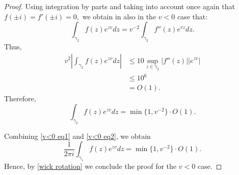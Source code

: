 \begin{proof}
        Using integration by parts and taking into account once again that $f(\pm i)=f'(\pm i)=0,$ we obtain in also in the $v < 0$ case that:
        $$\int_{\gamma_2}f(z)e^{zv}dz=v^{-2}\int_{\gamma_2}f''(z)e^{vz}dz.$$
        Thus,
        \begin{align*}
            v^2\left|\int_{\gamma_2}f(z)e^{zv}dz\right| &\leq 10\sup_{z\in\gamma_2}|f''(z)||e^{zv}|\\
                                                        &\leq 10^6\\
                                                        &= O(1).
        \end{align*}
        Therefore,
        \begin{equation}\label{v<0 eq2}
            \int_{\gamma_2}f(z)e^{zv}dz=\min\{1,v^{-2}\}\cdot O(1).
        \end{equation}

        Combining \eqref{v<0 eq1} and \eqref{v<0 eq2}, we obtain
        \begin{equation*}
            \frac1{2\pi i}\int_{\gamma_1}f(z)e^{zv}dz=\min\{1,v^{-2}\}\cdot O(1).
        \end{equation*}
        Hence, by \eqref{wick rotation} we conclude the proof for the $v < 0$ case.
    \end{proof}

